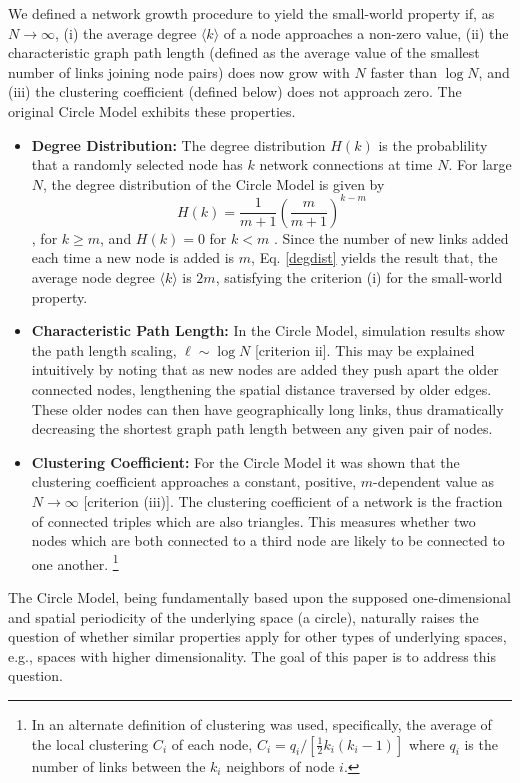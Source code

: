 \documentclass[aps,pre,reprint,superscriptaddress,amsmath,amssymb,nofootinbib]{revtex4-1}
\begin{document}
We defined a network growth procedure to yield the small-world property if, as $N \to \infty$,
(i) the average degree $\langle k \rangle$ of a node approaches a non-zero value,
(ii) the characteristic graph path length (defined as the average value of the smallest number of links joining node pairs) does now grow with $N$ faster than $\log N$, and
(iii) the clustering coefficient (defined below) does not approach zero.
The original Circle Model exhibits these properties.
\begin{itemize}
  \item \textbf{Degree Distribution:} The degree distribution $H(k)$ is the probablility that a randomly selected node has $k$ network connections at time $N$.
For large $N$, the degree distribution of the Circle Model is given by 
\begin{equation}\label{degdist}
H(k) = \frac{1}{m+1}\left(\frac{m}{m+1}\right)^{k-m}
\end{equation},
for $k \geq m$, and $H(k) = 0$ for $k < m$ \cite{ozik2004}.
Since the number of new links added each time a new node is added is $m$, Eq. \eqref{degdist} yields the result that, the average node degree $\langle k \rangle$ is $2m$, satisfying the criterion (i) for the small-world property.
  \item \textbf{Characteristic Path Length:} In the Circle Model, simulation results show the path length scaling, $\ell \sim \log N$ [criterion ii].
This may be explained intuitively by noting that as new nodes are added they push apart the older connected nodes, lengthening the spatial distance traversed by older edges. 
These older nodes can then have geographically long links, thus dramatically decreasing the shortest graph path length between any given pair of nodes.
  \item \textbf{Clustering Coefficient:} For the Circle Model it was shown  that the clustering coefficient approaches a constant, positive, $m$-dependent value as $N \to \infty$ [criterion (iii)]. 
The clustering coefficient of a network is the fraction of connected triples which are also triangles.
This measures whether two nodes which are both connected to a third node are likely to be connected to one another. \footnote{In \cite{ozik2004} an alternate definition of clustering was used, specifically, the average of the local clustering $C_i$ of each node, $C_i = q_i/[\frac{1}{2} k_i (k_i-1)]$ where $q_i$ is the number of links between the $k_i$ neighbors of node $i$.}
\end{itemize}
The Circle Model, being fundamentally based upon the supposed one-dimensional and spatial periodicity of the underlying space (a circle), naturally raises the question of whether similar properties apply for other types of underlying spaces, e.g., spaces with higher dimensionality. 
The goal of this paper is to address this question.
\end{document}
